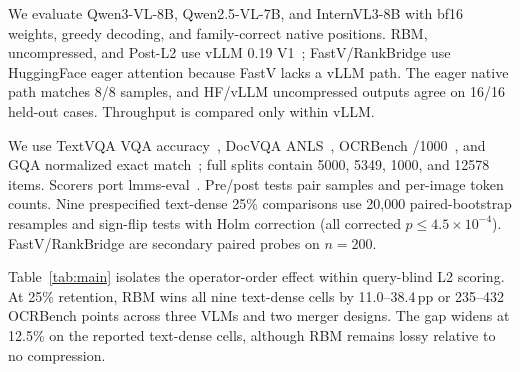 \documentclass[smallabstract,smallcaptions]{dccpaper}
\newcommand{\pp}{\,pp\xspace}
\begin{document}

We evaluate Qwen3-VL-8B, Qwen2.5-VL-7B, and InternVL3-8B with bf16 weights,
greedy decoding, and family-correct native positions. RBM, uncompressed, and
Post-L2 use vLLM 0.19 V1~\cite{kwon2023vllm}; FastV/RankBridge use HuggingFace
eager attention because FastV lacks a vLLM path. The eager native path matches
8/8 samples, and HF/vLLM uncompressed outputs agree on 16/16 held-out cases.
Throughput is compared only within vLLM.

We use TextVQA VQA accuracy~\cite{singh2019textvqa}, DocVQA
ANLS~\cite{mathew2021docvqa}, OCRBench /1000~\cite{liu2024ocrbench}, and GQA
normalized exact match~\cite{hudson2019gqa}; full splits contain 5000, 5349,
1000, and 12578 items. Scorers port lmms-eval~\cite{zhang2024lmmseval}.
Pre/post tests pair samples and per-image token counts. Nine prespecified
text-dense 25\% comparisons use 20,000 paired-bootstrap resamples and sign-flip
tests with Holm correction (all corrected $p\leq4.5\!\times\!10^{-4}$).
FastV/RankBridge are secondary paired probes on $n=200$.



Table~\ref{tab:main} isolates the operator-order effect within query-blind L2
scoring.
At 25\% retention, RBM wins all nine text-dense cells by 11.0--38.4\pp or
235--432 OCRBench points across three VLMs and two merger designs. The gap
widens at 12.5\% on the reported text-dense cells, although RBM remains lossy
relative to no compression.
\end{document}
